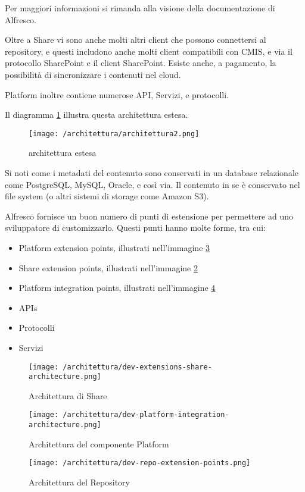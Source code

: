 Per maggiori informazioni si rimanda alla visione della documentazione di Alfresco.

Oltre a Share vi sono anche molti altri client che possono connettersi al repository, e questi includono anche molti client compatibili con CMIS, e via il protocollo SharePoint e il client SharePoint. Esiste anche, a pagamento, la possibilità di sincronizzare i contenuti nel cloud.

Platform inoltre contiene numerose \gls{API}, Servizi, e protocolli.

Il diagramma \ref{fig:architettura-estesa} illustra questa architettura estesa.

\begin{figure}[!ht]
\centering
\texttt{[image: /architettura/architettura2.png]}
\caption{architettura estesa\label{fig:architettura-estesa}}
\end{figure}

Si noti come i metadati del contenuto sono conservati in un database relazionale come PostgreSQL, MySQL, Oracle, e così via. Il contenuto in se è conservato nel file system (o altri sistemi di storage come Amazon S3).

Alfresco fornisce un buon numero di punti di estensione per permettere ad uno sviluppatore di customizzarlo. Questi punti hanno molte forme, tra cui:
\begin{itemize}
\item Platform extension points, illustrati nell'immagine \ref{fig:dev-platform-integration-architecture.png}
\item Share extension points, illustrati nell'immagine \ref{fig:dev-extensions-share-architecture}
\item Platform integration points, illustrati nell'immagine \ref{fig:dev-repo-extension-points.png}
\item \gls{API}s
\item Protocolli
\item Servizi
\end{itemize}
\begin{figure}[!ht]
\centering
\texttt{[image: /architettura/dev-extensions-share-architecture.png]}
\caption{Architettura di Share\label{fig:dev-extensions-share-architecture}}
\end{figure}
\begin{figure}[!ht]
\centering
\texttt{[image: /architettura/dev-platform-integration-architecture.png]}
\caption{Architettura del componente Platform\label{fig:dev-platform-integration-architecture.png}}
\end{figure}
\begin{figure}[!ht]
\centering
\texttt{[image: /architettura/dev-repo-extension-points.png]}
\caption{Architettura del Repository\label{fig:dev-repo-extension-points.png}}
\end{figure}
